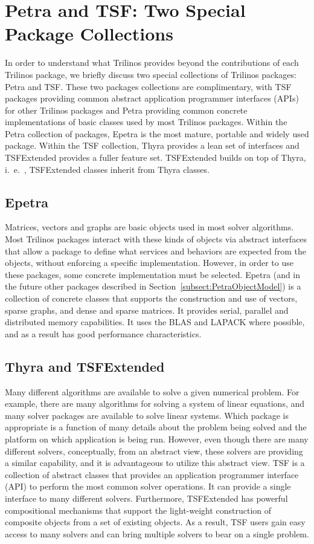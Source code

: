 \documentclass[12pt,relax]{TrilinosOverview}
\begin{document}
\section{Petra and TSF: Two Special Package Collections}
\label{sect:PetraAndTSF}
In order to understand what Trilinos provides beyond the
contributions of each Trilinos package, we briefly discuss two special
collections of
Trilinos packages: Petra and TSF.  These two packages collections are
complimentary, with TSF packages providing common abstract application
programmer interfaces (APIs) for other Trilinos packages and Petra
providing common concrete implementations of basic classes used by most
Trilinos packages.  Within the Petra collection of packages, Epetra is
the most mature, portable and widely used package.  Within the TSF
collection, Thyra provides a lean set of interfaces and TSFExtended
provides a fuller feature set.  TSFExtended builds on top of Thyra,
i.~e.~, TSFExtended classes inherit from Thyra classes.

\subsection{Epetra}
Matrices, vectors and graphs are basic objects used in most solver
algorithms. Most Trilinos
packages interact with these kinds of objects via abstract interfaces that
allow a package to define what services and behaviors are expected from 
the objects,
without enforcing a specific implementation.  However, in order to use
these packages, some concrete
implementation must be selected.  Epetra (and in the future other 
packages described
in Section~\ref{subsect:PetraObjectModel}) is a collection of concrete
classes that supports the construction and use of vectors, sparse
graphs, and dense and sparse matrices.  It provides serial, parallel and
 distributed memory
capabilities.  It uses the BLAS and LAPACK where possible, and as a
result has good performance characteristics.

\subsection{Thyra and TSFExtended}
\label{subsect:InteropTSF}
Many different algorithms are available to solve a given numerical
problem.  For example, there are many algorithms for solving a system
of linear equations, and many solver packages are available to solve
linear systems.  Which package is appropriate is a function of
many details about the problem being solved and the platform on which
application is being run. However, even though
there are many different solvers, conceptually, from an abstract view,
these solvers are providing a similar capability, and it is
advantageous to utilize this abstract view.
TSF is a collection of abstract classes that provides an application
programmer interface (API) to perform the most common solver
operations.  It can provide a single interface to many different
solvers.  Furthermore, TSFExtended has powerful compositional
mechanisms that support the
light-weight construction of composite objects from a set of
existing objects.  As a result, TSF users gain easy access to many
solvers and can bring multiple solvers to bear on a single problem.
\end{document}
